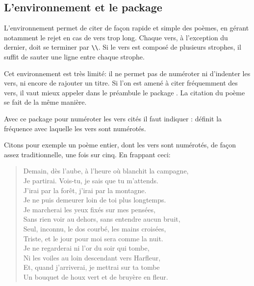 \subsection{L'environnement  et le package }


L'environnement   permet de citer de façon rapide et simple des poèmes, en gérant notamment le rejet en cas de vers trop long. Chaque vers, à l'exception du dernier, doit se terminer par \verb|\\|. Si le vers est composé de plusieurs strophes, il suffit de sauter une ligne entre chaque strophe.    

Cet environnement est très limité: il ne permet pas de numéroter ni d'indenter les vers, ni encore de rajouter un titre. Si l'on est amené à citer fréquemment des vers, il vaut mieux appeler dans le préambule le package . La citation du poème se fait de la même manière.


Avec ce package pour numéroter les vers cités il faut indiquer  :   
définit la fréquence avec laquelle les vers sont numérotés. 


Citons pour  exemple un poème entier, dont les vers sont numérotés, de façon assez traditionnelle, une fois sur cinq. En frappant ceci:
\begin{latexcode}
\begin{verse}

Demain, dès l'aube, à l'heure où blanchit la campagne,\\
Je partirai. Vois-tu, je sais que tu m'attends.\\
J'irai par la forêt, j'irai par la montagne.\\
Je ne puis demeurer loin de toi plus longtemps.\\

Je marcherai les yeux fixés sur mes pensées,\\
Sans rien voir au dehors, sans entendre aucun bruit,\\
Seul, inconnu, le dos courbé, les mains croisées,\\
Triste, et le jour pour moi sera comme la nuit.\\

Je ne regarderai ni l'or du soir qui tombe,\\
Ni les voiles au loin descendant vers Harfleur,\\
Et, quand j'arriverai, je mettrai sur ta tombe\\
Un bouquet de houx vert et de bruyère en fleur.

\end{verse}
\end{latexcode}

